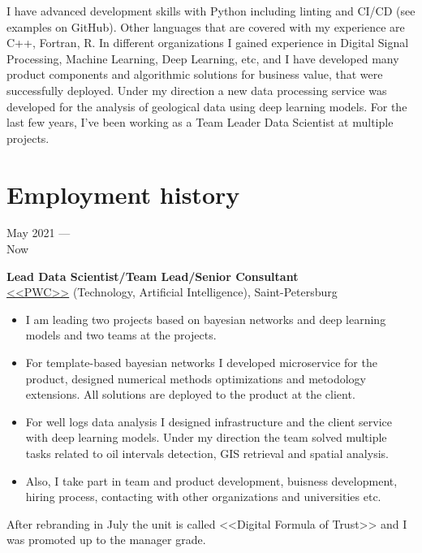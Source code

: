\documentclass[10pt,a4paper]{article}
\newcommand{\lmpratio}{0.15}
\newcommand{\rmpratio}{0.74}
\newcommand{\verticalSpace}{0.3cm}
\newcommand{\vSpace}{0.5cm}
\newcommand{\horizontalSpace}{0.05\textwidth}
\newcommand{\sectionMain}[1]{\textbf{#1}}
\begin{document}
I have advanced development skills with Python including linting and CI/CD (see examples on GitHub).
Other languages that are covered with my experience are C++, Fortran, R.
In different organizations I gained experience in Digital Signal Processing, Machine Learning, Deep Learning, etc, and I have developed many product components and algorithmic solutions for business value, that were successfully deployed. 
Under my direction a new data processing service was developed for the analysis of geological data using deep learning models.
For the last few years, I've been working as a Team Leader Data Scientist at multiple projects.

	

	
	\setlength{\parindent}{0em}
	\vspace{\verticalSpace}
	\vspace{\verticalSpace}
	\section*{Employment history}



	\begin{minipage}[t]{\lmpratio\textwidth}
		May 2021 --- \\Now
	\end{minipage}
	\hspace{\horizontalSpace}
	\begin{minipage}[t]{\rmpratio\textwidth}
		\sectionMain{Lead Data Scientist/Team Lead/Senior Consultant}\\
		\href{https://www.pwc.ru/}{<<PWC>>} (Technology, Artificial Intelligence), Saint-Petersburg\\[0.1cm]		
		
		\begin{itemize}
                \item 
I am leading two projects based on bayesian networks and deep learning models and two teams at the projects.
			\item 
For template-based bayesian networks I developed microservice for the product, designed numerical methods optimizations and metodology extensions.
All solutions are deployed to the product at the client.   
			\item 
For well logs data analysis I designed infrastructure and the client service with deep learning models.
Under my direction the team solved multiple tasks related to oil intervals detection, GIS retrieval and spatial analysis.
			\item 
Also, I take part in team and product development, buisness development, hiring process, contacting with other organizations and universities etc.

		\end{itemize}
		
		After rebranding in July the unit is called <<Digital Formula of Trust>> and I was promoted up to the manager grade.
		
	\end{minipage}	
	\vspace{\vSpace}
	
\end{document}
